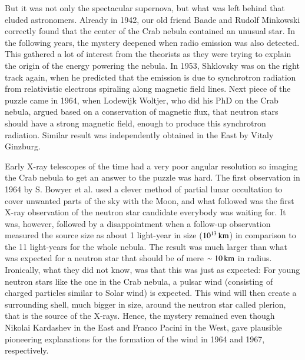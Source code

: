 But it was not only the spectacular supernova, but what was left behind that eluded astronomers.
Already in 1942, our old friend Baade and Rudolf Minkowski correctly found that the center of the Crab nebula contained an unusual star.\cite{Baade42, Minkowski42}
In the following years, the mystery deepened when radio emission was also detected.\cite{BSS49}
This gathered a lot of interest from the theorists as they were trying to explain the origin of the energy powering the nebula.
In 1953, Shklovsky was on the right track again, when he predicted that the emission is due to synchrotron radiation from relativistic electrons spiraling along magnetic field lines.
Next piece of the puzzle came in 1964, when Lodewijk Woltjer, who did his PhD on the Crab nebula, argued based on a conservation of magnetic flux, that neutron stars should have a strong magnetic field, enough to produce this synchrotron radiation.\cite{Woltjer64}
Similar result was independently obtained in the East by Vitaly Ginzburg.\cite{Ginzburg64}


Early X-ray telescopes of the time had a very poor angular resolution so imaging the Crab nebula to get an answer to the puzzle was hard.
The first observation in 1964 by S. Bowyer et al. used a clever method of partial lunar occultation to cover unwanted parts of the sky with the Moon, and what followed was the first X-ray observation of the neutron star candidate everybody was waiting for.\cite{BBC64a}
It was, however, followed by a disappointment when a follow-up observation measured the source size as about 1 light-year in size ($10^{13}\, \mathrm{km}$) in comparison to the 11 light-years for the whole nebula.\cite{BBC64b}
The result was much larger than what was expected for a neutron star that should be of mere $\sim 10\, \mathrm{km}$ in radius.
Ironically, what they did not know, was that this was just as expected:
For young neutron stars like the one in the Crab nebula, a pulsar wind (consisting of charged particles similar to Solar wind) is expected. 
This wind will then create a surrounding shell, much bigger in size, around the neutron star called plerion, that is the source of the X-rays.
Hence, the mystery remained even though Nikolai Kardashev in the East and Franco Pacini in the West, gave plausible pioneering explanations for the formation of the wind in 1964 and 1967, respectively.\cite{Kardashev64, Pacini67}



